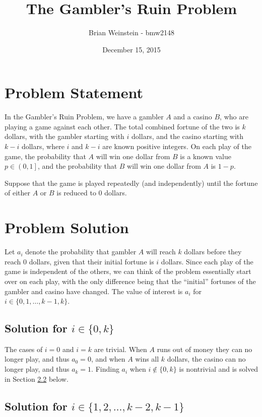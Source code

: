 \documentclass[a4paper,11pt]{article}
\title{The Gambler's Ruin Problem}
\author{Brian Weinstein - bmw2148}
\affil{Probability \& Statistics (STAT-W4700), Columbia University, Fall 2015}
\date{December 15, 2015}
\begin{document}
\maketitle



\section{Problem Statement}

In the Gambler's Ruin Problem, we have a gambler $A$ and a casino $B$, who are playing a game against each other. The total combined fortune of the two is $k$ dollars, with the gambler starting with $i$ dollars, and the casino starting with $k-i$ dollars, where $i$ and $k-i$ are known positive integers. On each play of the game, the probability that $A$ will win one dollar from $B$ is a known value $p\in\left(0,1\right]$, and the probability that $B$ will win one dollar from $A$ is $1-p$.

Suppose that the game is played repeatedly (and independently) until the fortune of either $A$ or $B$ is reduced to 0 dollars.



\section{Problem Solution}
Let $a_i$ denote the probability that gambler $A$ will reach $k$ dollars before they reach 0 dollars, given that their initial fortune is $i$ dollars. Since each play of the game is independent of the others, we can think of the problem essentially start over on each play, with the only difference being that the ``initial'' fortunes of the gambler and casino have changed. The value of interest is $a_i$ for $i\in\{0,1,\ldots,k-1,k\}$.

\subsection{Solution for $i \in \{0,k\}$}
\label{sec:solntrivial}

The cases of $i=0$ and $i=k$ are trivial. When $A$ runs out of money they can no longer play, and thus $a_0=0$, and when $A$ wins all $k$ dollars, the casino can no longer play, and thus $a_k=1$. Finding $a_i$ when $i\not\in\{0,k\}$ is nontrivial and is solved in Section \ref{sec:solnnontrivial} below.

\subsection{Solution for $i \in \{1,2,\ldots,k-2,k-1\}$}
\label{sec:solnnontrivial}
\end{document}
